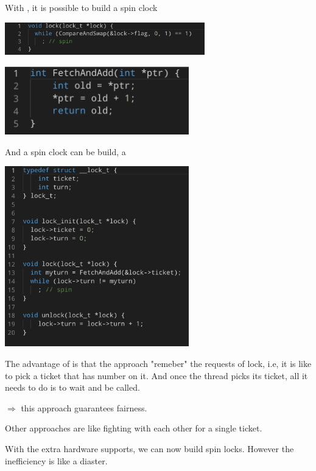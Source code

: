     With , it is possible to build a spin clock

    \includegraphics[width=0.65\textwidth]{chapters/Cucurrency/Cucurrency/compare_swap_spin_lock.png}


    \includegraphics[width=0.6\textwidth]{chapters/Cucurrency/Cucurrency/fetch_and_add.png}

    And a spin clock can be build, a 

    \includegraphics[width=0.6\textwidth]{chapters/Cucurrency/Cucurrency/ticket_lock.png}

    The advantage of  is that the approach "remeber" the requests of
    lock, i.e, it is like to pick a ticket that has number on it. And once the thread
    picks its ticket, all it needs to do is to wait and be called.

    $\Rightarrow$ this approach guarantees fairness.

    Other approaches are like fighting with each other for a single ticket.



    With the extra hardware supports, we can now build spin locks. However the inefficiency is like 
    a diaster.

